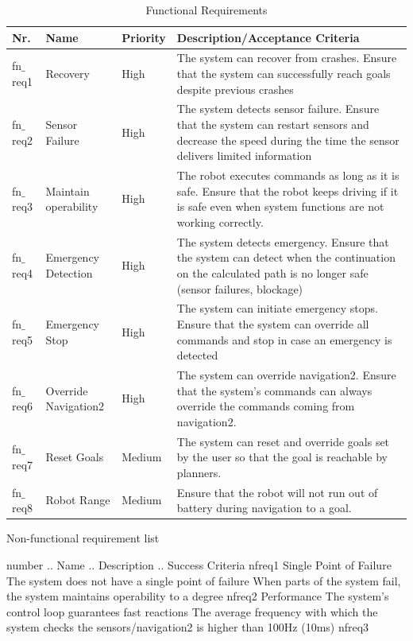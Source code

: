 \begin{table}[h!]
\caption{Functional Requirements}
	\begin{tabular}{| m{} | m{}| m{} | m{}|} 
  	\hline
  	Nr. & Name & Priority & Description/Acceptance Criteria \\ 
  	\hline
  	fn$\_$req1 & Recovery & High &  The system can recover from crashes. Ensure that the system can successfully reach goals despite previous crashes\\ 
  	\hline
  	fn$\_$req2 & Sensor Failure & High & The system detects sensor failure. Ensure that the system can restart sensors and decrease the speed during the time the sensor delivers limited information \\ 
  	\hline
  	fn$\_$req3 & Maintain operability & High & The robot executes commands as long as it is safe. Ensure that the robot keeps driving if it is safe even when system functions are not working correctly. \\
  	\hline
  	fn$\_$req4 & Emergency Detection & High & The system detects emergency. Ensure that the system can detect when the continuation on the calculated path is no longer safe (sensor failures, blockage) \\
  	\hline
  	fn$\_$req5 & Emergency Stop & High & The system can initiate emergency stops. Ensure that the system can override all commands and stop in case an emergency is detected \\
  	\hline
  	fn$\_$req6 & Override Navigation2 & High & The system can override navigation2. Ensure that the system's commands can always override the commands coming from navigation2. \\
  	\hline
  	fn$\_$req7 & Reset Goals & Medium & The system can reset and override goals set by the user so that the goal is reachable by planners. \\
  	\hline
  	fn$\_$req8 & Robot Range & Medium & Ensure that the robot will not run out of battery during navigation to a goal.  \\	
  	\hline
	\end{tabular}
\end{table}


Non-functional requirement list

number .. 	Name .. 				Description ..										Success Criteria
nfreq1 Single Point of Failure	The system does not have a single point of failure	When parts of the system fail, the system maintains operability to a degree
nfreq2 Performance	The system's control loop guarantees fast reactions	The average frequency with which the system checks the sensors/navigation2 is higher than 100Hz (10ms)
nfreq3

